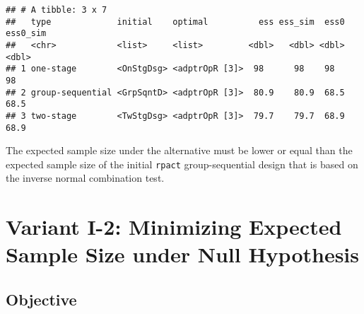 \documentclass[
]{book}
\newenvironment{Shaded}{\begin{snugshade}}{\end{snugshade}}
\newcommand{\DecValTok}[1]{\textcolor[rgb]{0.00,0.00,0.81}{#1}}
\newcommand{\FunctionTok}[1]{\textcolor[rgb]{0.00,0.00,0.00}{#1}}
\newcommand{\NormalTok}[1]{#1}
\newcommand{\SpecialCharTok}[1]{\textcolor[rgb]{0.00,0.00,0.00}{#1}}
\newcommand{\StringTok}[1]{\textcolor[rgb]{0.31,0.60,0.02}{#1}}
\begin{document}
\begin{verbatim}
## # A tibble: 3 x 7
##   type             initial    optimal          ess ess_sim  ess0 ess0_sim
##   <chr>            <list>     <list>         <dbl>   <dbl> <dbl>    <dbl>
## 1 one-stage        <OnStgDsg> <adptrOpR [3]>  98      98    98       98  
## 2 group-sequential <GrpSqntD> <adptrOpR [3]>  80.9    80.9  68.5     68.5
## 3 two-stage        <TwStgDsg> <adptrOpR [3]>  79.7    79.7  68.9     68.9
\end{verbatim}

The expected sample size under the alternative must be lower or equal than
the expected sample size of the initial \texttt{rpact} group-sequential design that
is based on the inverse normal combination test.

\begin{Shaded}
\end{Shaded}

\hypertarget{variantI_2}{%
\section{Variant I-2: Minimizing Expected Sample Size under Null Hypothesis}\label{variantI_2}}

\hypertarget{objective-1}{%
\subsection{Objective}\label{objective-1}}
\end{document}
